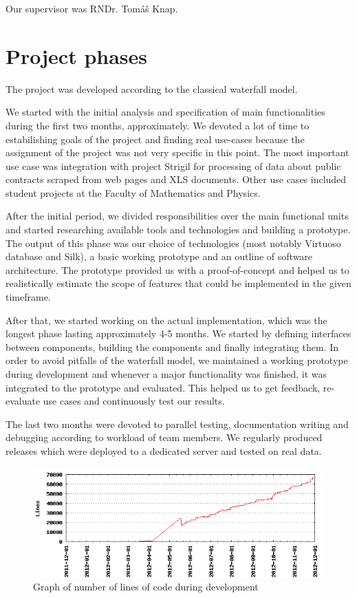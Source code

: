 Our supervisor was RNDr. Tom\'a\v s Knap.

\section*{Project phases}
The project was developed according to the classical waterfall model. 

We started with the initial analysis and specification of main functionalities  during the first two months, approximately. We devoted a lot of time to estabilishing goals of the project and finding real use-cases because the assignment of the project was not very specific in this point. The most important use case was integration with project Strigil for processing of data about public contracts scraped from web pages and XLS documents. Other use cases included student projects at the Faculty of Mathematics and Physics. 

After the initial period, we divided responsibilities over the main functional units and started researching available tools and technologies and building a prototype. The output of this phase was our choice of technologies (most notably Virtuoso database and Silk), a basic working prototype and an outline of software architecture. The prototype provided us with a proof-of-concept and helped us to realistically estimate the scope of features that could  be implemented in the given timeframe. 

After that, we started working on the actual implementation, which was the longest phase lasting approximately 4-5 months. We started by defining interfaces between components, building the components and finally integrating them. In order to avoid pitfalls of the waterfall model, we maintained a working prototype during development and whenever a major functionality was finished, it was integrated to the prototype and evaluated. This helped us to get feedback, re-evaluate use cases and continuously test our results.

The last two months were devoted to parallel testing, documentation writing and debugging according to workload of team members. We regularly produced releases which were deployed to a dedicated server and tested on real data.

\begin{figure}[htb]
    \centering
    \includegraphics[width=\textwidth]{images/lines-of-code.png}
    \caption{Graph of number of lines of code during development}
	\label{fig:linesOfCode}
\end{figure}


